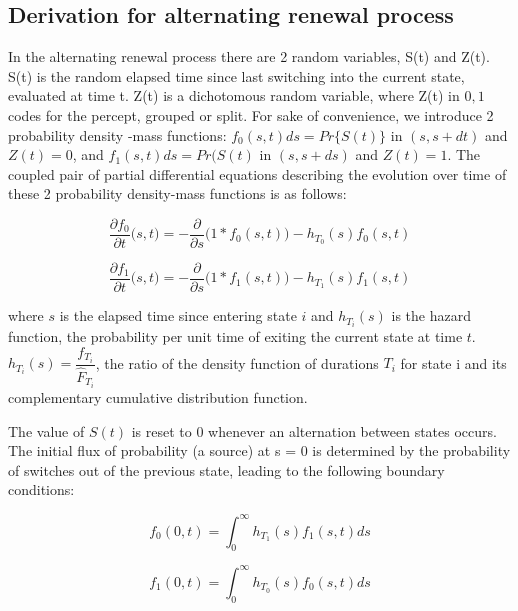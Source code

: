 \documentclass[10pt]{article}
\begin{document}
\subsection*{Derivation for alternating renewal process}
In the alternating renewal process there are 2 random variables, S(t) and Z(t). S(t) is the random elapsed time since last switching into the current state, evaluated at time t. Z(t) is a dichotomous random variable, where Z(t) in ${0,1}$ codes for the percept, grouped or split. For sake of convenience, we introduce 2 probability density -mass functions: $f_0(s,t) ds = Pr \lbrace S(t) \rbrace$ in $(s,s+dt)$ and $Z(t)=0$, and $f_1(s,t) ds= Pr(S(t)$ in $(s,s+ds)$ and $Z(t)=1$. The coupled pair of partial differential equations describing the evolution over time of these 2 probability density-mass functions is as follows:

\begin{equation}
\frac{\partial f_0}{\partial t} \big(s,t\big) = -\frac{\partial}{\partial s}\big(1 * f_0(s,t)\big) - h_{T_0}(s) f_0(s,t)
\end{equation}

\begin{equation}
\frac{\partial f_1}{\partial t} \big(s,t\big) = -\frac{\partial}{\partial s} \big(1 * f_1(s,t)\big) - h_{T_1}(s) f_1(s,t)
\end{equation}

where $s$ is the elapsed time since entering state $i$ and $h_{T_i}(s)$ is the hazard function, the probability per unit time of exiting the current state at time $t$. $h_{T_i}(s) = \dfrac{f_{T_i}}{\hat{F}_{T_i}}$, the ratio of the density function of durations $T_i$ for state i and its complementary cumulative distribution function.

The value of $S(t)$ is reset to 0 whenever an alternation between states occurs. The initial flux of probability (a source) at s = 0 is determined by the probability of switches out of the previous state, leading to the following boundary conditions:

\begin{equation}
f_0(0,t) = \int_0^\infty h_{T_1}(s) f_1(s,t) ds
\end{equation}

\begin{equation}
f_1(0,t) = \int_0^\infty h_{T_0}(s) f_0(s,t) ds
\end{equation}
\end{document}
